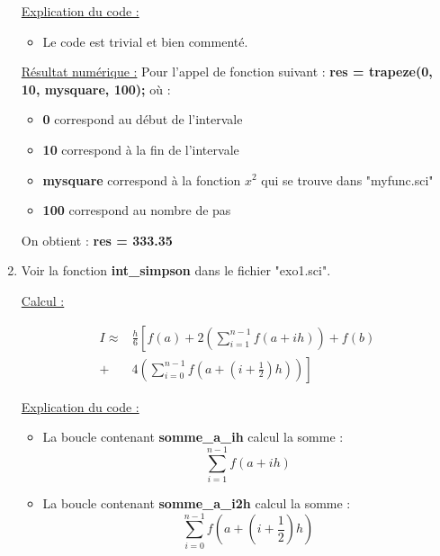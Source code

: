 \documentclass[12pt, letterpaper]{article}
\begin{document}
\begin{enumerate}
  \underline{Explication du code :}
  \begin{itemize}
    \item Le code est trivial et bien commenté.
  \end{itemize}
  
  \underline{Résultat numérique :} \newline
  Pour l'appel de fonction suivant : \newline
  \textbf{res = trapeze(0, 10, mysquare, 100);} \newline
  où :
  \begin{itemize}
  \item \textbf{0} correspond au début de l'intervale
  \item \textbf{10} correspond à la fin de l'intervale
  \item \textbf{mysquare} correspond à la fonction $x^2$ qui se trouve
    dans \newline "myfunc.sci"
  \item \textbf{100} correspond au nombre de pas
  \end{itemize}

  On obtient : \textbf{res = 333.35}

\item Voir la fonction \textbf{int\_simpson} dans le fichier
  "exo1.sci".

  \underline{Calcul :}

  \begin{equation*}
    \begin{split}
      I \approx & \frac{h}{6} \left[ f(a) + 2 \left( \sum_{i = 1}^{n - 1}
        {f(a + ih)} \right) + f(b) \right. \\
        + & \left. 4 \left( \sum_{i = 0}^{n - 1} {f \left(a + \left(i +
        \frac{1}{2} \right)h \right) } \right)
        \right]
    \end{split}
  \end{equation*}

  \underline{Explication du code :}
  \begin{itemize}
  \item La boucle contenant \textbf{somme\_a\_ih} calcul la somme :
    \begin{equation*}
      \sum_{i = 1}^{n - 1} f(a + ih)
    \end{equation*}
  \item La boucle contenant \textbf{somme\_a\_i2h} calcul la somme :
    \begin{equation*}
      \sum_{i = 0}^{n - 1} f(a + (i + \frac{1}{2})h)
    \end{equation*}
  \end{itemize}
  

\end{enumerate}
\end{document}
